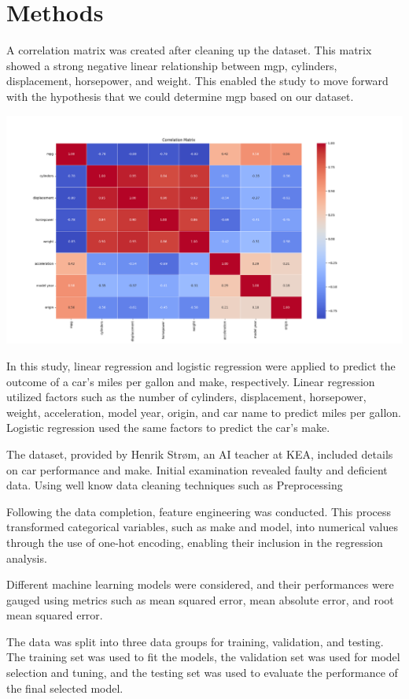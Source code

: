 \documentclass[a4paper, twocolumn]{article}
\begin{document}
\section{Methods\label{sec:Methods}}

A correlation matrix was created after cleaning up the dataset. This matrix showed a strong negative linear relationship between mgp, cylinders, displacement, horsepower, and weight. This enabled the study to move forward with the hypothesis that we could determine mgp based on our dataset. 

\includegraphics[width=0.9\linewidth]{images/Correlation.png}


In this study, linear regression and logistic regression were applied to predict the outcome of a car's miles per gallon and make, respectively. Linear regression utilized factors such as the number of cylinders, displacement, horsepower, weight, acceleration, model year, origin, and car name to predict miles per gallon. Logistic regression used the same factors to predict the car's make.

The dataset, provided by Henrik Strøm, an AI teacher at KEA, included details on car performance and make. Initial examination revealed faulty and deficient data. Using well know data cleaning techniques such as Preprocessing \textcite{hellerstein2013quantitative}

Following the data completion, feature engineering was conducted. This process transformed categorical variables, such as make and model, into numerical values through the use of one-hot encoding, enabling their inclusion in the regression analysis.

Different machine learning models were considered, and their performances were gauged using metrics such as mean squared error, mean absolute error, and root mean squared error.

The data was split into three data groups for training, validation, and testing. The training set was used to fit the models, the validation set was used for model selection and tuning, and the testing set was used to evaluate the performance of the final selected model.
\end{document}
